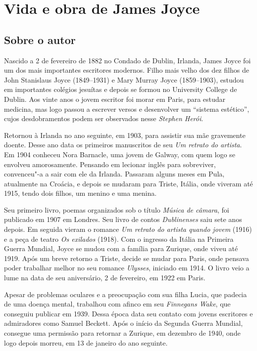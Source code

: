 \chapter{Vida e obra de James Joyce}

\section{Sobre o autor}

\noindent{}Nascido a 2 de fevereiro de 1882 no Condado de Dublin, Irlanda, James Joyce foi um dos mais importantes escritores modernos. Filho mais velho dos dez filhos de John Stanislaus Joyce (1849--1931) e Mary Murray Joyce (1859--1903), estudou em importantes colégios jesuítas e depois se formou no University College de Dublin. Aos vinte anos o jovem escritor foi morar em Paris, para estudar medicina, mas logo passou a escrever versos e desenvolver um ``sistema estético'', cujos desdobramentos podem ser observados nesse \textit{Stephen Herói}.

Retornou à Irlanda no ano seguinte, em 1903, para assistir sua mãe gravemente doente. Desse ano data os primeiros manuscritos de seu \emph{Um retrato do artista}. 
Em 1904 conheceu Nora Barnacle, uma jovem de Galway, com quem logo se envolveu amorosamente.
Pensando em lecionar inglês para sobreviver, convenceu"-a a sair com ele da Irlanda.
Passaram alguns meses em Pula, atualmente na Croácia, e depois se mudaram para Triste, Itália, onde viveram até 1915, tendo dois filhos, um menino e uma menina.

Seu primeiro livro, poemas organizados sob o título \textit{Música de câmara}, foi publicado em 1907 em Londres. Seu livro de contos \textit{Dublinenses} saiu sete anos depois. Em seguida vieram o romance \textit{Um retrato do artista quando jovem} (1916) e a peça de teatro \textit{Os exilados} (1918).
Com o ingresso da Itália na Primeira Guerra Mundial, Joyce se mudou com a família para Zurique, onde viveu até 1919. Após um breve retorno a Triste, decide se mudar para Paris, onde pensava poder trabalhar melhor no seu romance \textit{Ulysses}, iniciado em 1914.
O livro veio a lume na data de seu aniversário, 2 de fevereiro, em 1922 em Paris.

Apesar de problemas oculares e a preocupação com sua filha Lucia, que padecia de uma doença mental, trabalhou com afinco em seu \textit{Finnegans Wake}, que conseguiu publicar em 1939.
Dessa época data seu contato com jovens escritores e admiradores como Samuel Beckett.
Após o início da Segunda Guerra Mundial, consegue uma permissão para retornar a Zurique, em dezembro de 1940, onde logo depois morreu, em 13 de janeiro do ano seguinte.


